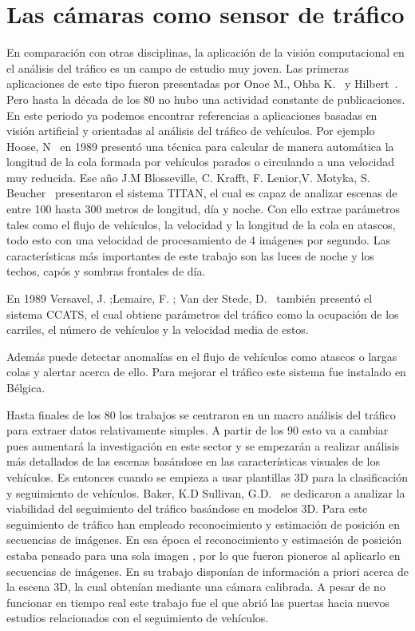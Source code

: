 \section{Las cámaras como sensor de tráfico}

En comparación con otras disciplinas, la aplicación de la visión computacional en el análisis del tráfico es un campo de estudio muy joven. Las primeras aplicaciones de este tipo fueron presentadas por Onoe  M.,  Ohba  K.~\cite{digital_analisis} y Hilbert~\cite{wide_area}. Pero hasta la década de los 80 no hubo una actividad constante de publicaciones. En este periodo ya podemos encontrar referencias a aplicaciones basadas en visión artificial y orientadas al análisis del tráfico de vehículos. Por ejemplo Hoose, N~\cite{queue_detection} en 1989 presentó una técnica para calcular de manera automática la longitud de la cola formada por vehículos parados o circulando a una velocidad muy reducida. Ese año J.M Blosseville, C. Krafft, F. Lenior,V. Motyka, S. Beucher~\cite{traffic_measurement} presentaron el sistema TITAN, el cual es capaz de analizar escenas de entre 100 hasta 300 metros de longitud, día y noche. Con ello extrae parámetros tales como el flujo de vehículos, la velocidad y la longitud de la cola en atascos, todo esto con una velocidad de procesamiento de 4 imágenes por segundo. Las características más importantes de este trabajo son las luces de noche y los techos, capós y sombras frontales de día. 

En 1989 Versavel, J. ;Lemaire, F. ; Van der Stede, D.~\cite{computer_aided} también presentó el sistema CCATS, el cual obtiene parámetros del tráfico como la ocupación de los carriles, el número de vehículos y la velocidad media de estos.

Además puede detectar anomalías en el flujo de vehículos como atascos o largas colas y alertar acerca de ello. Para mejorar el tráfico este sistema fue instalado en Bélgica.

Hasta finales de los 80 los trabajos se centraron en un macro análisis del tráfico para extraer datos relativamente simples. A partir de los 90 esto va a cambiar pues aumentará la investigación en este sector y se empezarán a realizar análisis más detallados de las escenas basándose en las características visuales de los vehículos. Es entonces cuando se empieza a usar plantillas 3D para la clasificación y seguimiento de vehículos. Baker, K.D Sullivan, G.D.~\cite{performance_assessment} se dedicaron a analizar la viabilidad del seguimiento del tráfico basándose en modelos 3D. Para este seguimiento de tráfico han empleado reconocimiento y estimación de posición en secuencias de imágenes. En esa época el reconocimiento y estimación de posición estaba pensado para una sola imagen , por lo que fueron pioneros al aplicarlo en secuencias de imágenes. En su trabajo disponían de información a priori acerca de la escena 3D, la cual obtenían mediante una cámara calibrada. A pesar de no funcionar en tiempo real este trabajo fue el que abrió las puertas hacia nuevos estudios relacionados con el seguimiento de vehículos.

